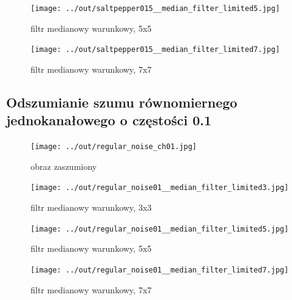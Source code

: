 \documentclass[a4paper,12pt]{article}
\begin{document}
\begin{figure}[h!]
\begin{minipage}[t]{7.5cm}
\begin{center}
\texttt{[image: ../out/saltpepper015\_\_median\_filter\_limited5.jpg]}
\caption{filtr medianowy warunkowy, 5x5}
\end{center}
\end{minipage}
\hfill
\begin{minipage}[t]{7.5cm}
\begin{center}
\texttt{[image: ../out/saltpepper015\_\_median\_filter\_limited7.jpg]}
\caption{filtr medianowy warunkowy, 7x7}
\end{center}
\end{minipage}
\end{figure}


\newpage
\subsection{Odszumianie szumu równomiernego jednokanałowego o częstości 0.1}
\begin{figure}[h!]
\begin{minipage}[t]{7.5cm}
\begin{center}
\texttt{[image: ../out/regular\_noise\_ch01.jpg]}
\caption{obraz zaszumiony}
\end{center}
\end{minipage}
\hfill
\begin{minipage}[t]{7.5cm}
\begin{center}
\texttt{[image: ../out/regular\_noise01\_\_median\_filter\_limited3.jpg]}
\caption{filtr medianowy warunkowy, 3x3}
\end{center}
\end{minipage}
\end{figure}

\begin{figure}[h!]
\begin{minipage}[t]{7.5cm}
\begin{center}
\texttt{[image: ../out/regular\_noise01\_\_median\_filter\_limited5.jpg]}
\caption{filtr medianowy warunkowy, 5x5}
\end{center}
\end{minipage}
\hfill
\begin{minipage}[t]{7.5cm}
\begin{center}
\texttt{[image: ../out/regular\_noise01\_\_median\_filter\_limited7.jpg]}
\caption{filtr medianowy warunkowy, 7x7}
\end{center}
\end{minipage}
\end{figure}
\end{document}
